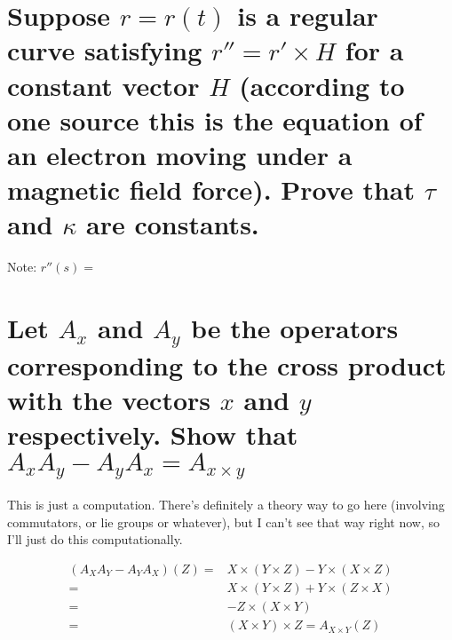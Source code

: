 \documentclass[12pt]{amsart}
\begin{document}
\section{Suppose $r=r(t)$ is a regular curve satisfying $r''=r'\times H$ for a constant vector $H$ (according to one source this is the equation of an electron moving under a magnetic field force). Prove that $\tau$ and $\kappa$ are constants.}
Note: $r''(s)=$

\section{Let $A_x$ and $A_y$ be the operators corresponding to the cross product with the vectors $x$ and $y$ respectively. Show that $A_xA_y-A_yA_x=A_{x\times y}$}
This is just a computation. There's definitely a theory way to go here (involving commutators, or lie groups or whatever), but I can't see that way right now, so I'll just do this computationally.
\begin{comment}\begin{align*}
	\left(A_xA_y-A_yA_x\right)(z)=&x\times(y\times z)-y\times(x\times z)
	\\=&x\times\left((y_2z_3-y_3z_2)i-(y_1z_3-y_3z_1)j+(y_2z_3-y_3z_2)k \right)
	\\&- y\times\left((x_2z_3-x_3z_2)i-(x_1z_3-x_3z_1)j+(x_2z_3-x_3z_2)k \right)
	\\=&(x_2y_2z_3-x_2y_3z_2+x_3y_1z_3-x_3y_3z_1)i
	\\&-(x_1y_2z_3-x_1y_3z_2-x_3y_2z_3+x_3y_3z_2)j
	\\&+
\end{align*}
\end{comment}
\begin{align*}
	(A_XA_Y-A_YA_X)(Z)=&X\times (Y\times Z)-Y\times(X\times Z)
	\\=&X\times(Y\times Z)+Y\times(Z\times X)
	\\=&-Z\times(X\times Y)
	\\=&(X\times Y)\times Z=A_{X\times Y}(Z)
\end{align*}
\end{document}
